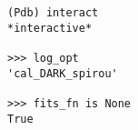 \documentclass[11pt]{article}
\begin{document}
\begin{itemize}
\begin{verbatim}
(Pdb) interact
*interactive*

>>> log_opt
'cal_DARK_spirou'

>>> fits_fn is None
True
\end{verbatim}
\end{itemize}


    
    
    
    
\end{document}
